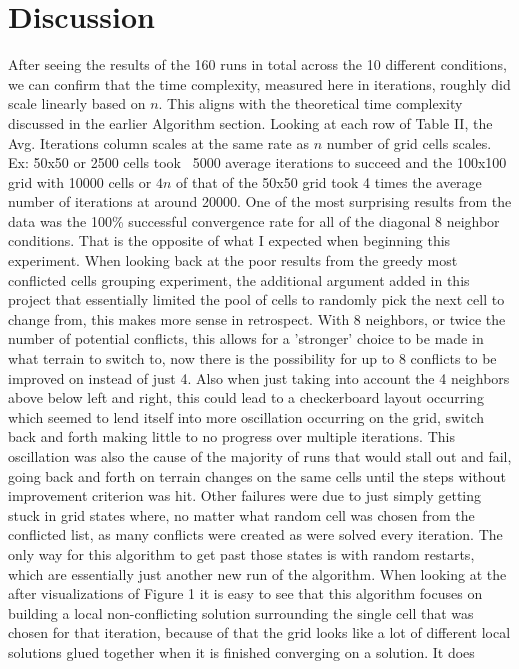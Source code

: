\documentclass[conference]{IEEEtran}
\begin{document}
\section{Discussion}
After seeing the results of the 160 runs in total across the 10 different conditions, we can confirm that the time complexity, measured here in iterations, roughly did scale linearly based on $n$. This aligns with the theoretical time complexity discussed in the earlier Algorithm section. Looking at each row of Table II, the Avg. Iterations column scales at the same rate as $n$ number of grid cells scales. Ex: 50x50 or 2500 cells took ~5000 average iterations to succeed and the 100x100 grid with 10000 cells or $4n$ of that of the 50x50 grid took 4 times the average number of iterations at around 20000. One of the most surprising results from the data was the 100\% successful convergence rate for all of the diagonal 8 neighbor conditions. That is the opposite of what I expected when beginning this experiment. When looking back at the poor results from the greedy most conflicted cells grouping experiment, the additional argument added in this project that essentially limited the pool of cells to randomly pick the next cell to change from, this makes more sense in retrospect. With 8 neighbors, or twice the number of potential conflicts, this allows for a 'stronger' choice to be made in what terrain to switch to, now there is the possibility for up to 8 conflicts to be improved on instead of just 4. Also when just taking into account the 4 neighbors above below left and right, this could lead to a checkerboard layout occurring which seemed to lend itself into more oscillation occurring on the grid, switch back and forth making little to no progress over multiple iterations. This oscillation was also the cause of the majority of runs that would stall out and fail, going back and forth on terrain changes on the same cells until the steps without improvement criterion was hit. Other failures were due to just simply getting stuck in grid states where, no matter what random cell was chosen from the conflicted list, as many conflicts were created as were solved every iteration. The only way for this algorithm to get past those states is with random restarts, which are essentially just another new run of the algorithm. When looking at the after visualizations of Figure 1 it is easy to see that this algorithm focuses on building a local non-conflicting solution surrounding the single cell that was chosen for that iteration, because of that the grid looks like a lot of different local solutions glued together when it is finished converging on a solution. It does 
\end{document}
